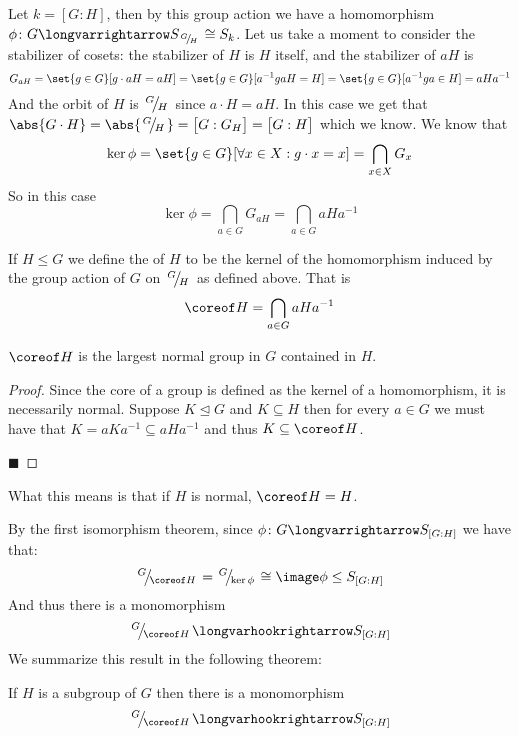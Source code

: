 \documentclass[10pt]{article}
\def\slfrac#1#2{\left.{}^{#1}\mkern-4mu\middle/\mkern-3mu{}_{#2}\right.}
\let\normalsub=\trianglelefteq
\let\mmorph=\longvarhookrightarrow
\begin{document}
Let $k=[G:H]$, then by this group action we have a homomorphism $\phi\colon G\longvarrightarrow S_{\slfrac GH}\cong S_k$.
Let us take a moment to consider the stabilizer of cosets: the stabilizer of $H$ is $H$ itself, and the stabilizer of $aH$ is
\[ G_{aH} = \set{g\in G}[g\cdot aH=aH] = \set{g\in G}[a^{-1}gaH=H] = \set{g\in G}[a^{-1}ga\in H] = aHa^{-1} \]
And the orbit of $H$ is $\slfrac GH$ since $a\cdot H=aH$.
In this case we get that $\abs{G\cdot H}=\abs{\slfrac GH}=\bigl[G:G_H\bigr]=\bigl[G:H\bigr]$ which we know.
We know that
\[ \ker\phi = \set{g\in G}[\forall x\in X: g\cdot x=x] = \bigcap_{x\in X}G_x \]
So in this case
\[ \ker\phi = \bigcap_{a\in G} G_{aH} = \bigcap_{a\in G}aHa^{-1} \]

\begin{defn*}

    If $H\leq G$ we define the  of $H$ to be the kernel of the homomorphism induced by the group action of $G$ on $\slfrac GH$ as defined above.
    That is
    \[ \coreof H = \bigcap_{a\in G}aHa^{-1} \]

\end{defn*}

\begin{prop*}

    $\coreof H$ is the largest normal group in $G$ contained in $H$.

\end{prop*}

\begin{proof}

    Since the core of a group is defined as the kernel of a homomorphism, it is necessarily normal.
    Suppose $K\normalsub G$ and $K\subseteq H$ then for every $a\in G$ we must have that $K=aKa^{-1}\subseteq aHa^{-1}$ and thus $K\subseteq\coreof H$.

    \hfill$\blacksquare$

\end{proof}

What this means is that if $H$ is normal, $\coreof H=H$.

By the first isomorphism theorem, since $\phi\colon G\longvarrightarrow S_{[G:H]}$ we have that:
\[ \slfrac G{\coreof H}=\slfrac G{\ker\phi}\cong\image\phi\leq S_{[G:H]} \]
And thus there is a monomorphism
\[ \slfrac G{\coreof H}\mmorph S_{[G:H]} \]
We summarize this result in the following theorem:

\begin{thrm*}

    If $H$ is a subgroup of $G$ then there is a monomorphism
    \[ \slfrac G{\coreof H}\mmorph S_{[G:H]} \]

\end{thrm*}
\end{document}
